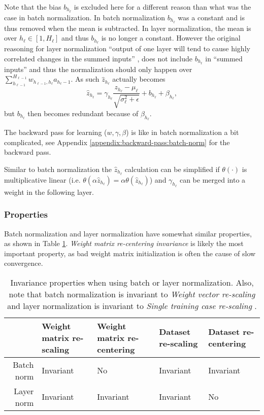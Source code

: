 Note that the bias $b_{h_\ell}$ is excluded here for a different reason than what was the case in batch normalization. In batch normalization $b_{h_\ell}$ was a constant and is thus removed when the mean is subtracted. In layer normalization, the mean is over $h_\ell \in [1, H_\ell]$ and thus $b_{h_\ell}$ is no longer a constant. However the original reasoning for layer normalization ``output of one layer will tend to cause highly correlated changes in the summed inputs'' \cite{layer-normalization}, does not include $b_{h_\ell}$ in ``summed inputs'' and thus the normalization should only happen over $\sum_{h_{\ell-1}}^{H_{\ell-1}} w_{h_{\ell-1},h_\ell} a_{h_\ell-1}$. As such $\hat{z}_{h_\ell}$ actually becomes
\begin{equation*}
\hat{z}_{h_\ell} = \gamma_{h_\ell} \frac{z_{h_\ell} - \mu_{\ell}}{\sqrt{\sigma_{\ell}^2 + \epsilon}} + b_{h_\ell} + \beta_{h_\ell},
\end{equation*}
but $ b_{h_\ell}$ then becomes redundant because of $\beta_{h_\ell}$.

The backward pass for learning ($w, \gamma, \beta$) is like in batch normalization a bit complicated, see Appendix \ref{appendix:backward-pass:batch-norm} for the backward pass.

Similar to batch normalization the $\hat{z}_{h_\ell}$ calculation can be simplified if $\theta(\cdot)$ is multiplicative linear (i.e. $\theta(\alpha \hat{z}_{h_\ell}) = \alpha \theta(\hat{z}_{h_\ell})$) and $\gamma_{h_\ell}$ can be merged into a weight in the following layer.

\subsubsection{Properties}

Batch normalization and layer normalization have somewhat similar properties, as shown in Table \ref{table:convergence:layer-norm:properties}. \textit{Weight matrix re-centering invariance} is likely the most important property, as bad weight matrix initialization is often the cause of slow convergence. 

\begin{table}[H]
\centering
\begin{tabular}{r|p{2cm} p{2cm} p{2cm} p{2cm}}
	           & Weight matrix re-scaling & Weight matrix re-centering & Dataset re-scaling& Dataset re-centering \\ \hline
	Batch norm & Invariant & No & Invariant & Invariant \\
	Layer norm & Invariant & Invariant & Invariant & No \\
\end{tabular}
\caption{Invariance properties when using batch or layer normalization. Also, note that batch normalization is invariant to \textit{Weight vector re-scaling} and layer normalization is invariant to \textit{Single training case re-scaling} \cite{layer-normalization}.}
\label{table:convergence:layer-norm:properties}
\end{table}

